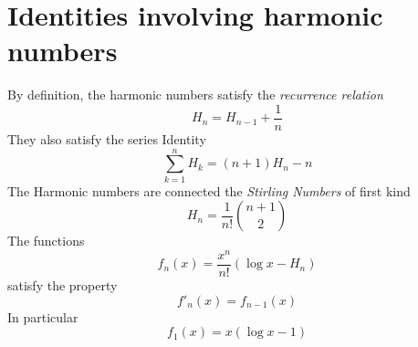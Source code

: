 \documentclass[2pt]{article}
\begin{document}
\section{Identities involving harmonic numbers}
By definition, the harmonic numbers satisfy the \emph{recurrence relation}
\begin{equation} 
H_{n}=H_{n-1}+\frac{1}{n} \label{recurrence relation}
\end{equation}
They also satisfy the series Identity
\begin{equation}
\sum_{k=1}^n H_{k} = (n+1) H_{n} - n \label{Series Identity}
\end{equation}
The Harmonic numbers are connected the \emph{Stirling Numbers} of first kind
\begin{equation}
H_{n} = \frac{1}{n!} {n+1 \choose 2} \label{Stirling Identity}
\end{equation}
The functions
\begin{equation}
f_{n} (x) = \frac{x^n}{n!} (\log{x}-H_{n})
\end{equation}
satisfy the property
\begin{equation}
{f'}_{n} (x) = f_{n-1} (x)
\end{equation}
In particular
\begin{equation}
f_{1} (x) = x(\log{x}-1)       			
\end{equation}
\end{document}
